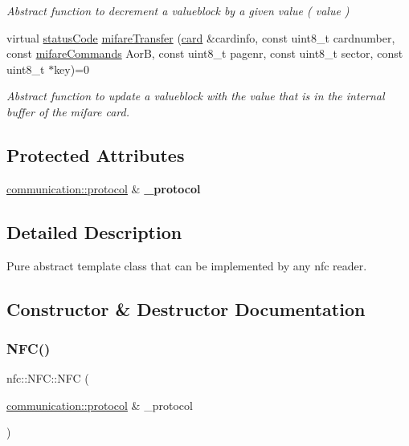 \begin{DoxyCompactItemize}
\begin{DoxyCompactList}\small\item\em Abstract function to decrement a valueblock by a given value ( value ) \end{DoxyCompactList}\item 
virtual \hyperlink{declarations_8h_ae1d20c5a38cae82ccaa6a77be3fd264b}{status\+Code} \hyperlink{classnfc_1_1NFC_adbbca8ec51da75e498c7a9f10346ee07}{mifare\+Transfer} (\hyperlink{classcard}{card} \&cardinfo, const uint8\+\_\+t cardnumber, const \hyperlink{declarations_8h_a305b1a3bcfca65e2a82f0f9d24676835}{mifare\+Commands} AorB, const uint8\+\_\+t pagenr, const uint8\+\_\+t sector, const uint8\+\_\+t $\ast$key)=0
\begin{DoxyCompactList}\small\item\em Abstract function to update a valueblock with the value that is in the internal buffer of the mifare card. \end{DoxyCompactList}\end{DoxyCompactItemize}
\subsection*{Protected Attributes}
\begin{DoxyCompactItemize}
\item 
\mbox{\label{classnfc_1_1NFC_ac6089dd87172f3ce870767500e53b9e8}} 
\hyperlink{classcommunication_1_1protocol}{communication\+::protocol} \& {\bfseries \+\_\+protocol}
\end{DoxyCompactItemize}


\subsection{Detailed Description}
Pure abstract template class that can be implemented by any nfc reader. 

\subsection{Constructor \& Destructor Documentation}
\mbox{\label{classnfc_1_1NFC_a6ebeb8952cb8be604ef33d4188f86303}} 
\subsubsection{\texorpdfstring{N\+F\+C()}{NFC()}}
{\footnotesize\ttfamily nfc\+::\+N\+F\+C\+::\+N\+FC (\begin{DoxyParamCaption}\item[{\hyperlink{classcommunication_1_1protocol}{communication\+::protocol} \&}]{\+\_\+protocol }\end{DoxyParamCaption})\hspace{0.3cm}{\ttfamily [inline]}}



